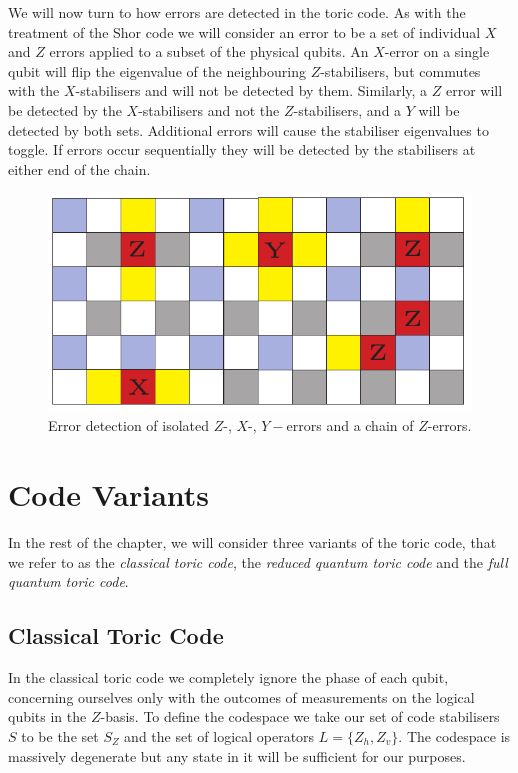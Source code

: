 We will now turn to how errors are detected in the toric code. As with the treatment of the Shor code we will consider an error to be a set of individual $X$ and $Z$ errors applied to a subset of the physical qubits. An $X$-error on a single qubit will flip the eigenvalue of the neighbouring $Z$-stabilisers, but commutes with the $X$-stabilisers and will not be detected by them. Similarly, a $Z$ error will be detected by the $X$-stabilisers and not the $Z$-stabilisers, and a $Y$ will be detected by both sets. Additional errors will cause the stabiliser eigenvalues to toggle. If errors occur sequentially they will be detected by the stabilisers at either end of the chain.


\begin{figure}[htb]
  \begin{center}
    \includegraphics{assets/basic_errors.pdf}
  \end{center}
  \caption{Error detection of isolated $Z$-, $X$-, $Y-$errors and a chain of $Z$-errors.}
  \label{basic_errors}
\end{figure}

\section{Code Variants}

In the rest of the chapter, we will consider three variants of the toric code, that we refer to as the \textit{classical toric code}, the \textit{reduced quantum toric code} and the \textit{full quantum toric code}.

\subsection{Classical Toric Code}

In the classical toric code we completely ignore the phase of each qubit, concerning ourselves only with the outcomes of measurements on the logical qubits in the $Z$-basis. To define the codespace we take our set of code stabilisers $S$ to be the set $S_Z$ and the set of logical operators $L=\{Z_h, Z_v\}$. The codespace is massively degenerate but any state in it will be sufficient for our purposes.

